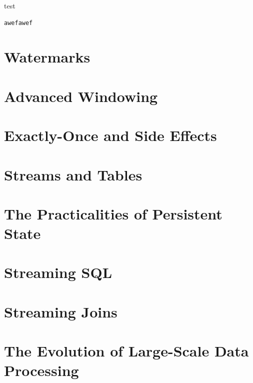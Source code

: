 \documentclass[11pt]{article}
\begin{document}
\begin{listing}[H]
\caption{test}
\begin{verbatim}
awefawef
\end{verbatim}
\end{listing}
\section{Watermarks}
\label{sec:org050c69d}

\section{Advanced Windowing}
\label{sec:org90f653a}

\section{Exactly-Once and Side Effects}
\label{sec:org4571db9}

\section{Streams and Tables}
\label{sec:org584cd1e}

\section{The Practicalities of Persistent State}
\label{sec:org780623f}

\section{Streaming SQL}
\label{sec:org55645ca}

\section{Streaming Joins}
\label{sec:org677ab71}

\section{The Evolution of Large-Scale Data Processing}
\label{sec:org2e8c33f}
\end{document}
